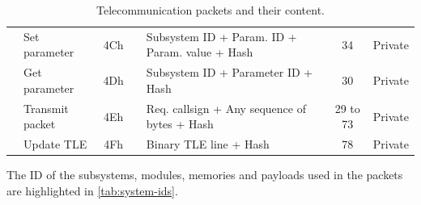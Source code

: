 \begin{landscape}
\begin{table}[ht]
\begin{tabular}{L{1.8cm}lcllcc}
                                     & Set parameter       & 4Ch &                                     & Subsystem ID + Param. ID + Param. value + Hash    & 34        & Private \\
                                     & Get parameter       & 4Dh &                                     & Subsystem ID + Parameter ID + Hash                & 30        & Private \\
                                     & Transmit packet     & 4Eh &                                     & Req. callsign + Any sequence of bytes + Hash      & 29 to 73  & Private \\
                                     & Update TLE          & 4Fh &                                     & Binary TLE line + Hash                            & 78        & Private \\
            \bottomrule[1.5pt]
        \end{tabular}
        \caption{Telecommunication packets and their content.}
        \label{tab:packets-struct}
    \end{table}
\end{landscape}

The ID of the subsystems, modules, memories and payloads used in the packets are highlighted in \autoref{tab:system-ids}.

